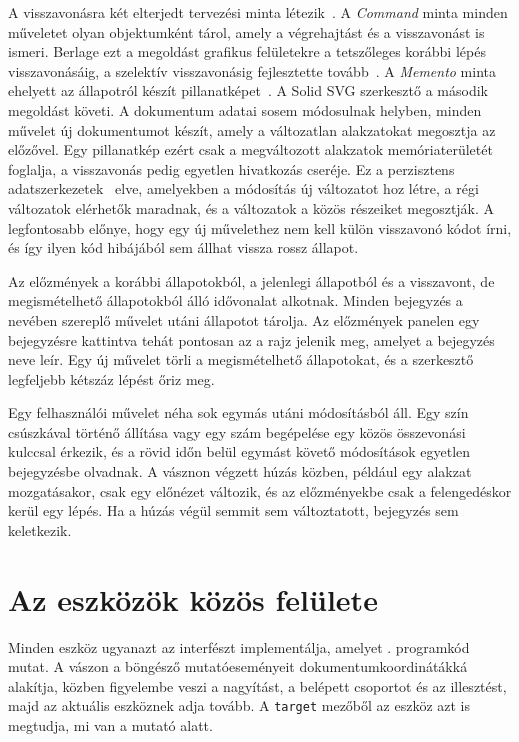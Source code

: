 A visszavonásra két elterjedt tervezési minta létezik~\cite{gof}. A \textit{Command} minta minden műveletet olyan objektumként tárol, amely a végrehajtást és a visszavonást is ismeri. Berlage ezt a megoldást grafikus felületekre a tetszőleges korábbi lépés visszavonásáig, a szelektív visszavonásig fejlesztette tovább~\cite{berlage1994}. A \textit{Memento} minta ehelyett az állapotról készít pillanatképet~\cite{okasaki1998}. A Solid SVG szerkesztő a második megoldást követi. A dokumentum adatai sosem módosulnak helyben, minden művelet új dokumentumot készít, amely a változatlan alakzatokat megosztja az előzővel. Egy pillanatkép ezért csak a megváltozott alakzatok memóriaterületét foglalja, a visszavonás pedig egyetlen hivatkozás cseréje. Ez a perzisztens adatszerkezetek~\cite{driscoll1989} elve, amelyekben a módosítás új változatot hoz létre, a régi változatok elérhetők maradnak, és a változatok a közös részeiket megosztják. A legfontosabb előnye, hogy egy új művelethez nem kell külön visszavonó kódot írni, és így ilyen kód hibájából sem állhat vissza rossz állapot.

Az előzmények a korábbi állapotokból, a jelenlegi állapotból és a visszavont, de megismételhető állapotokból álló idővonalat alkotnak. Minden bejegyzés a nevében szereplő művelet utáni állapotot tárolja. Az előzmények panelen egy bejegyzésre kattintva tehát pontosan az a rajz jelenik meg, amelyet a bejegyzés neve leír. Egy új művelet törli a megismételhető állapotokat, és a szerkesztő legfeljebb kétszáz lépést őriz meg.

Egy felhasználói művelet néha sok egymás utáni módosításból áll. Egy szín csúszkával történő állítása vagy egy szám begépelése egy közös összevonási kulccsal érkezik, és a rövid időn belül egymást követő módosítások egyetlen bejegyzésbe olvadnak. A vásznon végzett húzás közben, például egy alakzat mozgatásakor, csak egy előnézet változik, és az előzményekbe csak a felengedéskor kerül egy lépés. Ha a húzás végül semmit sem változtatott, bejegyzés sem keletkezik.

\section{Az eszközök közös felülete}
\label{sec:tool_design}

Minden eszköz ugyanazt az interfészt implementálja, amelyet . programkód mutat. A vászon a böngésző mutatóeseményeit dokumentumkoordinátákká alakítja, közben figyelembe veszi a nagyítást, a belépett csoportot és az illesztést, majd az aktuális eszköznek adja tovább. A \texttt{target} mezőből az eszköz azt is megtudja, mi van a mutató alatt.

